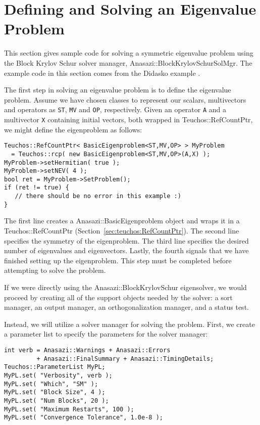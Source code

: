 \section{Defining and Solving an Eigenvalue Problem}
\label{sec:anasazi:example}

This section gives sample code for solving a symmetric eigenvalue problem using
the Block Krylov Schur solver manager, Anasazi::BlockKrylovSchurSolMgr. The example code in this section comes from the
Didasko example .

The first step in solving an eigenvalue problem is to define the eigenvalue
problem. Assume we have chosen classes to represent our scalars, multivectors
and operators as \verb!ST!, \verb!MV! and \verb!OP!, respectively. Given an
operator \verb!A! and a multivector \verb!X! containing initial vectors, both
wrapped in Teuchos::RefCountPtr, we might define the eigenproblem as
follows:
\begin{verbatim}
Teuchos::RefCountPtr< BasicEigenproblem<ST,MV,OP> > MyProblem 
  = Teuchos::rcp( new BasicEigenproblem<ST,MV,OP>(A,X) );
MyProblem->setHermitian( true );
MyProblem->setNEV( 4 );
bool ret = MyProblem->SetProblem();
if (ret != true) {
   // there should be no error in this example :)
}
\end{verbatim}

The first line creates a Anasazi::BasicEigenproblem object and wraps it in a
Teuchos::RefCountPtr (Section~\ref{sec:teuchos:RefCountPtr}). The second line
specifies the symmetry of the eigenproblem.
The third line specifies the desired
number of eigenvalues and eigenvectors. Lastly, the fourth signals that we have
finished setting up the eigenproblem. This step must be completed before
attempting to solve the problem.

If we were directly using the Anasazi::BlockKrylovSchur eigensolver, we would proceed by
creating all of the support objects needed by the solver: a sort manager, an output
manager, an orthogonalization manager, and a status test.

Instead, we will utilize a solver manager for solving the problem.
First, we create a parameter list to specify the parameters for the solver manager:
\begin{verbatim}
int verb = Anasazi::Warnings + Anasazi::Errors 
         + Anasazi::FinalSummary + Anasazi::TimingDetails;
Teuchos::ParameterList MyPL;
MyPL.set( "Verbosity", verb );
MyPL.set( "Which", "SM" );
MyPL.set( "Block Size", 4 );
MyPL.set( "Num Blocks", 20 );
MyPL.set( "Maximum Restarts", 100 );
MyPL.set( "Convergence Tolerance", 1.0e-8 );
\end{verbatim}

